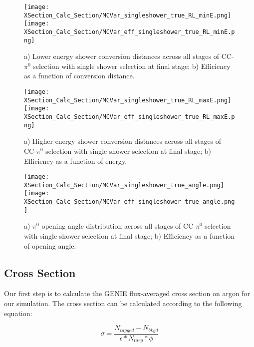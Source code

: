 \begin{figure}[h!]
\centering
\texttt{[image: XSection\_Calc\_Section/MCVar\_singleshower\_true\_RL\_minE.png]}
\hspace{1 mm}
\texttt{[image: XSection\_Calc\_Section/MCVar\_eff\_singleshower\_true\_RL\_minE.png]}
\caption{a) Lower energy shower conversion distances across all stages of CC-$\pi^0$ selection with single shower selection at final stage; b) Efficiency as a function of conversion distance. }
\label{fig:pi0_effs_11}
\end{figure}

\begin{figure}[h!]
\centering
\texttt{[image: XSection\_Calc\_Section/MCVar\_singleshower\_true\_RL\_maxE.png]}
\hspace{1 mm}
\texttt{[image: XSection\_Calc\_Section/MCVar\_eff\_singleshower\_true\_RL\_maxE.png]}
\caption{a) Higher energy shower conversion distances across all stages of CC-$\pi^0$ selection with single shower selection at final stage; b) Efficiency as a function of energy. }
\label{fig:pi0_effs_12}
\end{figure}


\begin{figure}[h!]
\texttt{[image: XSection\_Calc\_Section/MCVar\_singleshower\_true\_angle.png]}
\hspace{3 mm}
\texttt{[image: XSection\_Calc\_Section/MCVar\_eff\_singleshower\_true\_angle.png]}
\caption{a) $\pi^0$ opening angle distribution across all stages of CC $\pi^0$ selection with single shower selection at final stage; b) Efficiency as a function of opening angle. }
\label{fig:pi0_effs_13}
\end{figure}

\clearpage
\subsection{Cross Section}

Our first step is to calculate the GENIE flux-averaged cross section on argon for our simulation. The cross section can be calculated according to the following equation:

\begin{equation}
  \sigma = \frac{N_{tagged} - N_{bkgd}}{\epsilon*N_{targ}*\phi}
\end{equation}

